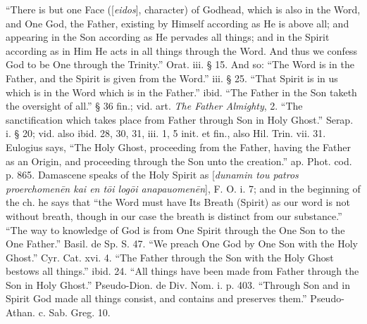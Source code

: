 ``There is but one Face ([\emph{eidos}],
character) of Godhead, which is also in the Word, and One God, the
Father, existing by Himself according as He is above all; and appearing in the Son according as He pervades all things; and in the
Spirit according as in Him He acts in all things through the Word. And
thus we confess God to be One through the Trinity.'' Orat. iii. § 15.
And so: ``The Word is in the Father, and the Spirit is given from the
Word.'' iii. § 25. ``That Spirit is in us which is in the Word which is
in the Father.'' ibid. ``The Father in the Son taketh the oversight of
all.'' § 36 fin.; vid. art. \emph{The Father Almighty}, 2. ``The sanctification which takes place from Father through
Son in Holy Ghost.'' Serap. i. § 20; vid. also ibid. 28, 30, 31, iii.
1, 5 init. et fin., also Hil. Trin. vii. 31. Eulogius says, ``The Holy
Ghost, proceeding from the Father, having the Father as an Origin, and
proceeding through the Son unto the creation.'' ap. Phot. cod. p. 865.
Damascene speaks of the Holy Spirit as [\emph{dunamin tou patros
proerchomen\={e}n kai en t\={o}i log\={o}i anapauomen\={e}n}],
F. O. i. 7; and in the beginning of the ch. he says that ``the Word
must have Its Breath (Spirit) as our word is not without breath,
though in our case the breath is distinct from our substance.'' ``The
way to knowledge of God is from One Spirit through the One Son to the
One Father.'' Basil. de Sp. S. 47. ``We preach One God by One Son with
the Holy Ghost.'' Cyr. Cat. xvi. 4. ``The Father through the Son with
the Holy Ghost bestows all things.'' ibid. 24. ``All things have been
made from Father through the Son in Holy Ghost.'' Pseudo-Dion. de Div.
Nom. i. p. 403. ``Through Son and in Spirit God made all things
consist, and contains and preserves them.'' Pseudo-Athan. c. Sab. Greg.
10.

